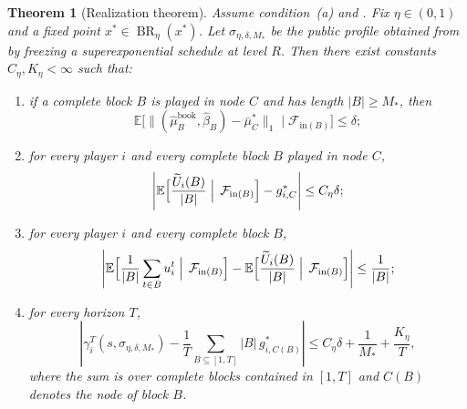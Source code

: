\documentclass[12pt]{article}
\newtheorem{theorem}{Theorem}[section]
\theoremstyle{definition}
\newcommand{\E}{\mathbb{E}}
\newcommand{\1}{\mathbf{1}}
\newcommand{\cF}{\mathcal{F}}
\DeclareMathOperator{\BR}{BR}
\begin{document}
\begin{theorem}[Realization theorem]
\label{thm:realization}
Assume condition~\textnormal{(a)} and . Fix
$\eta\in(0,1)$ and a fixed point $x^*\in\BR_\eta(x^*)$. Let
$\sigma_{\eta,\delta,M_*}$ be the public profile obtained from
 by freezing a superexponential schedule at level $R$.
Then there exist constants $C_\eta,K_\eta<\infty$ such that:
\begin{enumerate}[label=\textnormal{(Q\arabic*)},leftmargin=2.8em]
\item if a complete block $B$ is played in node $C$ and has length $|B|\ge M_*$,
then
\begin{equation}
\label{eq:block-occupation-realization}
\E\bigl[\|(\widehat\mu_B^{\mathrm{book}},\widehat\beta_B)-\bar\mu_C^*\|_1
\mid \cF_{\mathrm{in}(B)}\bigr]
\le \delta;
\end{equation}
\item for every player $i$ and every complete block $B$ played in node $C$,
\begin{equation}
\label{eq:block-payoff-realization}
\left|
\E\Bigl[\frac{\widetilde U_i(B)}{|B|}
\Bigm|\,\cF_{\mathrm{in}(B)}\Bigr]-g_{i,C}^*
\right|
\le C_\eta\delta;
\end{equation}
\item for every player $i$ and every complete block $B$,
\begin{equation}
\label{eq:block-stage-vs-aug}
\left|
\E\Bigl[\frac1{|B|}\sum_{t\in B}u_i^t
\Bigm|\,\cF_{\mathrm{in}(B)}\Bigr]
-
\E\Bigl[\frac{\widetilde U_i(B)}{|B|}
\Bigm|\,\cF_{\mathrm{in}(B)}\Bigr]
\right|
\le \frac1{|B|};
\end{equation}
\item for every horizon $T$,
\begin{equation}
\label{eq:realization-tail-bound}
\left|
\gamma_i^T(s,\sigma_{\eta,\delta,M_*})
-
\frac1T\sum_{B\subseteq [1,T]} |B|\,g_{i,C(B)}^*
\right|
\le C_\eta\delta + \frac{1}{M_*} + \frac{K_\eta}{T},
\end{equation}
where the sum is over complete blocks contained in $[1,T]$ and $C(B)$ denotes the
node of block $B$.
\end{enumerate}
\end{theorem}
\end{document}
